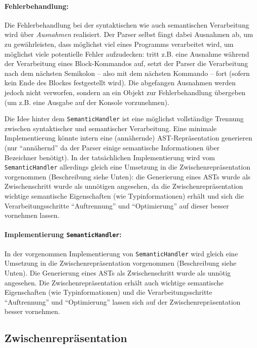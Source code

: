 \documentclass[twoside,a4paper,fleqn,12pt]{article}
\begin{document}
\paragraph{Fehlerbehandlung:}
Die Fehlerbehandlung bei der syntaktischen wie auch semantischen Verarbeitung wird über \emph{Ausnahmen}
realisiert. Der Parser selbst fängt dabei Ausnahmen ab, um zu gewährleisten, dass möglichst viel eines
Programms verarbeitet wird, um möglichst viele potentielle Fehler aufzudecken: %
tritt z.B. eine Ausnahme während der Verarbeitung eines Block-Kommandos auf, setzt der Parser die
Verarbeitung nach dem nächsten Semikolon -- also mit dem nächsten Kommando -- fort (sofern kein Ende
des Blockes festgestellt wird).
Die abgefangen Ausnahmen werden jedoch nicht verworfen, sondern an ein Objekt zur Fehlerbehandlung
übergeben (um z.B. eine Ausgabe auf der Konsole vorzunehmen).

Die Idee hinter dem \verb+SemanticHandler+ ist eine möglichst vollständige Trennung zwischen syntaktischer
und semantischer Verarbeitung. Eine minimale Implementierung könnte intern eine (annähernde)
AST-Repräsentation generieren (nur "`annähernd"' da der Parser einige semantische Informationen über
Bezeichner benötigt). In der tatsächlichen Implementierung wird vom \verb+SemanticHandler+ allerdings 
gleich eine Umsetzung in die Zwischenrepräsentation vorgenommen (Beschreibung siehe Unten):
die Generierung eines ASTs wurde als Zwischenschritt wurde als unnötigen angesehen, da die Zwischenrepräsentation
wichtige semantische Eigenschaften (wie Typinformationen) erhält und sich die Verarbeitungsschritte "`Auftrennung"'
und "`Optimierung"' auf dieser besser vornehmen lassen.

\paragraph{Implementierung \texttt{SemanticHandler}:}
In der vorgenommen Implementierung von \verb+SemanticHandler+ wird gleich eine Umsetzung in die Zwischenrepräsentation vorgenommen
(Beschreibung siehe Unten). Die Generierung eines ASTs als Zwischenschritt wurde als unnötig angesehen.
Die Zwischenrepräsentation erhält auch wichtige semantische Eigenschaften (wie Typinformationen) und
die Verarbeitungsschritte "`Auftrennung"' und "`Optimierung"' lassen sich auf der Zwischenrepräsentation besser vornehmen.


\subsection{Zwischenrepräsentation}
\end{document}
